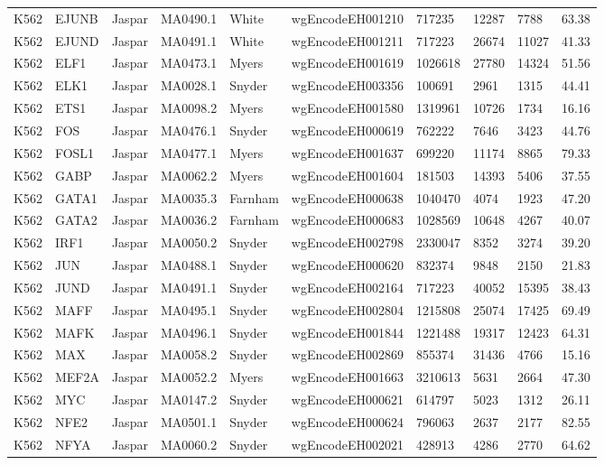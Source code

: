 {\begin{longtable}{p{1.1cm}p{1.0cm}p{1.0cm}p{1.0cm}p{1.0cm}p{2.3cm}p{1.0cm}p{0.8cm}p{0.8cm}p{0.8cm}}
K562 & EJUNB & Jaspar & MA0490.1 & White & wgEncodeEH001210 & 717235 & 12287 & 7788 & 63.38\\
K562 & EJUND & Jaspar & MA0491.1 & White & wgEncodeEH001211 & 717223 & 26674 & 11027 & 41.33\\
K562 & ELF1 & Jaspar & MA0473.1 & Myers & wgEncodeEH001619 & 1026618 & 27780 & 14324 & 51.56\\
K562 & ELK1 & Jaspar & MA0028.1 & Snyder & wgEncodeEH003356 & 100691 & 2961 & 1315 & 44.41\\
K562 & ETS1 & Jaspar & MA0098.2 & Myers & wgEncodeEH001580 & 1319961 & 10726 & 1734 & 16.16\\
K562 & FOS & Jaspar & MA0476.1 & Snyder & wgEncodeEH000619 & 762222 & 7646 & 3423 & 44.76\\
K562 & FOSL1 & Jaspar & MA0477.1 & Myers & wgEncodeEH001637 & 699220 & 11174 & 8865 & 79.33\\
K562 & GABP & Jaspar & MA0062.2 & Myers & wgEncodeEH001604 & 181503 & 14393 & 5406 & 37.55\\
K562 & GATA1 & Jaspar & MA0035.3 & Farnham & wgEncodeEH000638 & 1040470 & 4074 & 1923 & 47.20\\
K562 & GATA2 & Jaspar & MA0036.2 & Farnham & wgEncodeEH000683 & 1028569 & 10648 & 4267 & 40.07\\
K562 & IRF1 & Jaspar & MA0050.2 & Snyder & wgEncodeEH002798 & 2330047 & 8352 & 3274 & 39.20\\
K562 & JUN & Jaspar & MA0488.1 & Snyder & wgEncodeEH000620 & 832374 & 9848 & 2150 & 21.83\\
K562 & JUND & Jaspar & MA0491.1 & Snyder & wgEncodeEH002164 & 717223 & 40052 & 15395 & 38.43\\
K562 & MAFF & Jaspar & MA0495.1 & Snyder & wgEncodeEH002804 & 1215808 & 25074 & 17425 & 69.49\\
K562 & MAFK & Jaspar & MA0496.1 & Snyder & wgEncodeEH001844 & 1221488 & 19317 & 12423 & 64.31\\
K562 & MAX & Jaspar & MA0058.2 & Snyder & wgEncodeEH002869 & 855374 & 31436 & 4766 & 15.16\\
K562 & MEF2A & Jaspar & MA0052.2 & Myers & wgEncodeEH001663 & 3210613 & 5631 & 2664 & 47.30\\
K562 & MYC & Jaspar & MA0147.2 & Snyder & wgEncodeEH000621 & 614797 & 5023 & 1312 & 26.11\\
K562 & NFE2 & Jaspar & MA0501.1 & Snyder & wgEncodeEH000624 & 796063 & 2637 & 2177 & 82.55\\
K562 & NFYA & Jaspar & MA0060.2 & Snyder & wgEncodeEH002021 & 428913 & 4286 & 2770 & 64.62\\

\end{longtable}}
